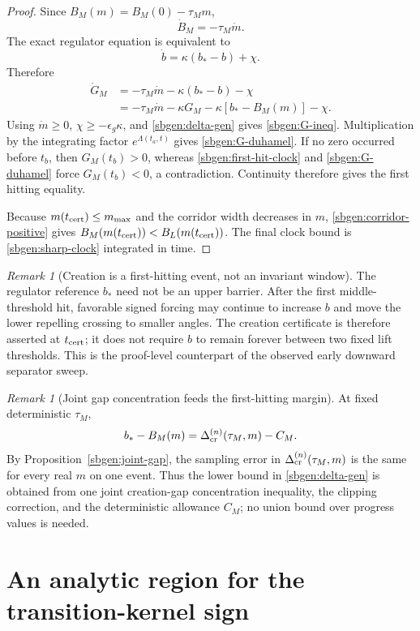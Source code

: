 \documentclass{article} %
\theoremstyle{plain}
\theoremstyle{definition}
\theoremstyle{remark}
\newtheorem{remark}[theorem]{Remark}
\begin{document}
\begin{proof}
Since
$B_M(m)=B_M(0)-\tau_Mm$,
\[
\dot B_M=-\tau_M\dot m.
\]
The exact regulator equation is equivalent to
\[
\dot b=\kappa(b_*-b)+\chi.
\]
Therefore
\[
\begin{aligned}
\dot G_M
&=
-\tau_M\dot m
-\kappa(b_*-b)-\chi
\\
&=
-\tau_M\dot m
-\kappa G_M
-\kappa[b_*-B_M(m)]
-\chi.
\end{aligned}
\]
Using $\dot m\ge0$, $\chi\ge-\epsilon_g\kappa$, and
\eqref{sbgen:delta-gen} gives \eqref{sbgen:G-ineq}.  Multiplication by the
integrating factor $e^{\Lambda(t_a,t)}$ gives
\eqref{sbgen:G-duhamel}.  If no zero occurred before $t_b$, then
$G_M(t_b)>0$, whereas \eqref{sbgen:first-hit-clock} and
\eqref{sbgen:G-duhamel} force $G_M(t_b)<0$, a contradiction.  Continuity
therefore gives the first hitting equality.

Because $m(t_{\rm cert})\le m_{\max}$ and the corridor width decreases in
$m$, \eqref{sbgen:corridor-positive} gives
$B_M(m(t_{\rm cert}))<B_L(m(t_{\rm cert}))$.  The final clock bound is
\eqref{sbgen:sharp-clock} integrated in time.
\end{proof}

\begin{remark}[Creation is a first-hitting event, not an invariant window]
The regulator reference $b_*$ need not be an upper barrier.  After the first
middle-threshold hit, favorable signed forcing may continue to increase $b$
and move the lower repelling crossing to smaller angles.  The creation
certificate is therefore asserted at $t_{\rm cert}$; it does not require
$b$ to remain forever between two fixed lift thresholds.  This is the
proof-level counterpart of the observed early downward separator sweep.
\end{remark}

\begin{remark}[Joint gap concentration feeds the first-hitting margin]
At fixed deterministic $\tau_M$,
\[
b_*-B_M(m)
=
\Delta_{\rm cr}^{(n)}(\tau_M,m)-C_M.
\]
By Proposition~\ref{sbgen:joint-gap}, the sampling error in
$\Delta_{\rm cr}^{(n)}(\tau_M,m)$ is the same for every real $m$ on one event.
Thus the lower bound in \eqref{sbgen:delta-gen} is obtained from one joint
creation-gap concentration inequality, the clipping correction, and the
deterministic allowance $C_M$; no union bound over progress values is needed.
\end{remark}


\section{An analytic region for the transition-kernel sign}
\label{sbgen:J-section}
\end{document}
